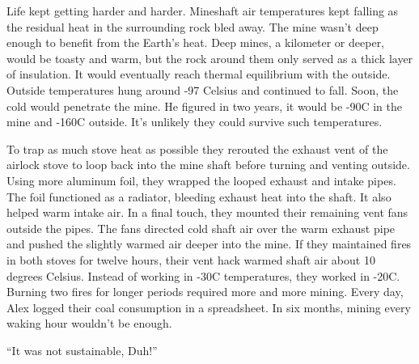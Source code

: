 Life kept getting harder and harder. Mineshaft air temperatures kept
falling as the residual heat in the surrounding rock bled away. The mine
wasn't deep enough to benefit from the Earth's heat. Deep mines, a
kilometer or deeper, would be toasty and warm, but the rock around them
only served as a thick layer of insulation. It would eventually reach
thermal equilibrium with the outside. Outside temperatures hung around
-97 Celsius and continued to fall. Soon, the cold would penetrate the
mine. He figured in two years, it would be -90C in the mine and -160C
outside. It's unlikely they could survive such temperatures.

To trap as much stove heat as possible they rerouted the exhaust vent of
the airlock stove to loop back into the mine shaft before turning and
venting outside. Using more aluminum foil, they wrapped the looped
exhaust and intake pipes. The foil functioned as a radiator, bleeding
exhaust heat into the shaft. It also helped warm intake air. In a final
touch, they mounted their remaining vent fans outside the pipes. The
fans directed cold shaft air over the warm exhaust pipe and pushed the
slightly warmed air deeper into the mine. If they maintained fires in
both stoves for twelve hours, their vent hack warmed shaft air about 10
degrees Celsius. Instead of working in -30C temperatures, they worked in
-20C. Burning two fires for longer periods required more and more
mining. Every day, Alex logged their coal consumption in a spreadsheet.
In six months, mining every waking hour wouldn't be enough.

``It was not sustainable, Duh!''


%
 

